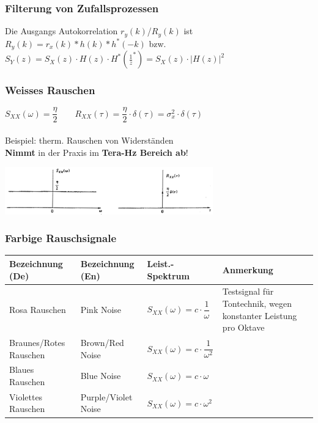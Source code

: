 \subsubsection{Filterung von Zufallsprozessen}
Die Ausgangs Autokorrelation $r_y(k)$/$R_y(k)$ ist\\
 $R_y(k) = r_x(k)\ast h(k) \ast h^*(-k)$ bzw. $\boxed{S_{Y}(z) = S_{X}(z)\cdot H(z) \cdot H^*(\frac 1 z^*)=S_X(z)\cdot|H(z)|^2}$

\subsubsection{Weisses Rauschen}
\begin{center}
	\begin{minipage}{8cm}
		$S_{XX}(\omega) = \dfrac{\eta}{2} \qquad R_{XX}(\tau) = \dfrac{\eta}{2} \cdot \delta(\tau)= \sigma_x^2 \cdot \delta(\tau)$ \\ \\
		Beispiel: therm. Rauschen von Widerständen \\
		\textbf{Nimmt} in der Praxis im \textbf{Tera-Hz Bereich ab}!
  	\end{minipage}
	\begin{minipage}{10cm}
		\includegraphics[width=9cm]{bilder/weisses_rauschen.png}
  	\end{minipage}
\end{center}

\subsubsection{Farbige Rauschsignale}
\renewcommand{\arraystretch}{2}
\begin{tabular}[c]{ | p{4cm} | p{3.5cm} | p{3cm} | p{6cm} | }
	\hline
		\textbf{Bezeichnung (De)}
		& \textbf{Bezeichnung (En)}
		& \textbf{Leist.-Spektrum}
		& \textbf{Anmerkung} \\
	\hline
		Rosa Rauschen
		& Pink Noise
		& $S_{XX}(\omega) = c \cdot \dfrac{1}{\omega}$
		& Testsignal für Tontechnik, wegen konstanter Leistung pro Oktave \\
	\hline
		Braunes/Rotes Rauschen
		& Brown/Red Noise
		&	$S_{XX}(\omega) = c \cdot \dfrac{1}{\omega^2}$
		& \\
	\hline
		Blaues Rauschen
		& Blue Noise
		&	$S_{XX}(\omega) = c \cdot \omega$
		& \\
	\hline
		Violettes Rauschen
		& Purple/Violet Noise
		&	$S_{XX}(\omega) = c \cdot \omega^2$
		& \\
    \hline
\end{tabular}
\renewcommand{\arraystretch}{1}

